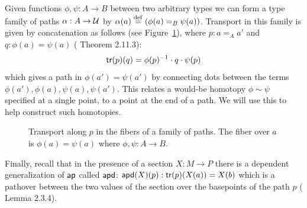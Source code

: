 Given functions \( \phi,\psi:A\to B \) between two arbitrary types we can form a type family of paths \( \alpha:A\to\mathcal{U} \) by \( \alpha(a)\stackrel{\mathrm{def}}{=}(\phi(a)=_B\psi(a)) \). Transport in this family is given by concatenation as follows (see Figure~\ref{fig:transport_family_of_paths}), where \( p:a=_A a' \) and \( q:\phi(a)=\psi(a) \) (\cite{hottbook} Theorem 2.11.3):
\[ 
\mathsf{tr}(p)(q) = \phi(p)^{-1}\cdot q\cdot \psi(p)
\]
which gives a path in \( \phi(a')=\psi(a') \) by connecting dots between the terms \( \phi(a'), \phi(a), \psi(a), \psi(a') \). This relates a would-be homotopy \( \phi\sim\psi \) specified at a single point, to a point at the end of a path. We will use this to help construct such homotopies.
\begin{figure}[h]
\centering
{}
\caption{Transport along \( p \) in the fibers of a family of paths. The fiber over \( a \) is \( \phi(a)=\psi(a) \) where \( \phi,\psi:A\to B \).}
\label{fig:transport_family_of_paths}
\end{figure}

Finally, recall that in the presence of a section \( X:M\to P \) there is a dependent generalization of \( \mathsf{ap} \) called \( \mathsf{apd} \): \( \mathsf{apd}(X)(p):\mathsf{tr}(p)(X(a))=X(b) \) which is a pathover between the two values of the section over the basepoints of the path \( p \) (\cite{hottbook} Lemma 2.3.4).
